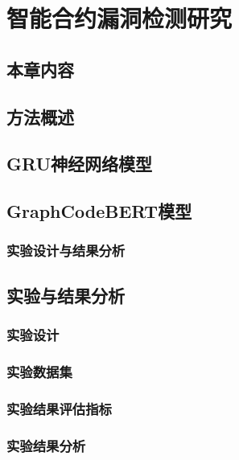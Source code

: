 \chapter{智能合约漏洞检测研究}
\section{本章内容}
\section{方法概述}
\section{GRU神经网络模型}
\section{GraphCodeBERT模型}
\subsection{实验设计与结果分析}
\section{实验与结果分析}
\subsection{实验设计}
\subsection{实验数据集}
\subsection{实验结果评估指标}
\subsection{实验结果分析}
